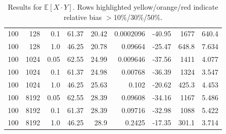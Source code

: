 \documentclass{article}
\begin{document}
\begin{table}[htbp]
\begin{tabular}{rrr|rrrrrr}
\rowcolor{red!40}100 & 128 & 0.1 & 61.37 & 20.42 & 0.0002096 & -40.95 & 1677 & 640.4 \\
\rowcolor{red!40}100 & 128 & 1.0 & 46.25 & 20.78 & 0.09664 & -25.47 & 648.8 & 7.634 \\
\midrule
\rowcolor{red!40}100 & 1024 & 0.05 & 62.55 & 24.99 & 0.009646 & -37.56 & 1411 & 4.077 \\
\rowcolor{red!40}100 & 1024 & 0.1 & 61.37 & 24.98 & 0.00768 & -36.39 & 1324 & 3.547 \\
\rowcolor{orange!50}100 & 1024 & 1.0 & 46.25 & 25.63 & 0.102 & -20.62 & 425.3 & 4.453 \\
\midrule
\rowcolor{red!40}100 & 8192 & 0.05 & 62.55 & 28.39 & 0.09608 & -34.16 & 1167 & 5.486 \\
\rowcolor{red!40}100 & 8192 & 0.1 & 61.37 & 28.39 & 0.09716 & -32.98 & 1088 & 5.422 \\
\rowcolor{orange!50}100 & 8192 & 1.0 & 46.25 & 28.9 & 0.2425 & -17.35 & 301.1 & 3.714 \\
\bottomrule
\end{tabular}
\caption{Results for $\mathbb{E}[X \cdot Y]$. Rows highlighted yellow/orange/red indicate relative bias $>$10\%/30\%/50\%.}
\label{tab:EZ}
\end{table}
\end{document}
